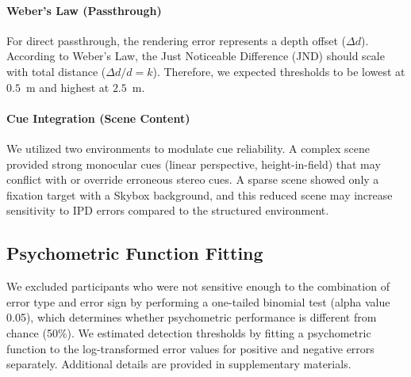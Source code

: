     \paragraph{Weber's Law (Passthrough)} For direct passthrough, the rendering error represents a depth offset ($\Delta d$). According to Weber's Law, the Just Noticeable Difference (JND) should scale with total distance ($\Delta d / d = k$). Therefore, we expected thresholds to be lowest at $0.5$~m and highest at $2.5$~m.
    \paragraph{Cue Integration (Scene Content)} We utilized two environments to modulate cue reliability. A complex scene provided strong monocular cues (linear perspective, height-in-field) that may conflict with or override erroneous stereo cues. A sparse scene showed only a fixation target with a Skybox background, and this reduced scene may increase sensitivity to IPD errors compared to the structured environment.

\subsection{Psychometric Function Fitting}
We excluded participants who were not sensitive enough to the combination of error type and error sign by performing a one-tailed binomial test (alpha value 0.05), which determines whether psychometric performance is different from chance (50\%). We estimated detection thresholds by fitting a psychometric function to the log-transformed error values for positive and negative errors separately. Additional details are provided in supplementary materials. 


